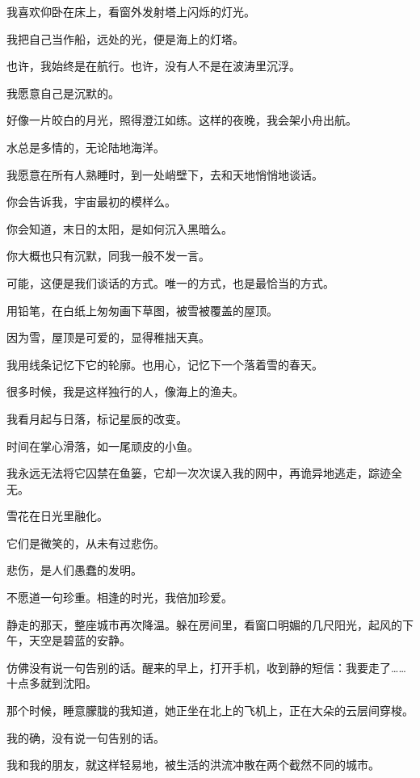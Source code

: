 		\vspace{1em}
		我喜欢仰卧在床上，看窗外发射塔上闪烁的灯光。\par
		我把自己当作船，远处的光，便是海上的灯塔。\par
		也许，我始终是在航行。也许，没有人不是在波涛里沉浮。\par
		我愿意自己是沉默的。\par
		好像一片皎白的月光，照得澄江如练。这样的夜晚，我会架小舟出航。\par
		水总是多情的，无论陆地海洋。\par
		我愿意在所有人熟睡时，到一处峭壁下，去和天地悄悄地谈话。\par
		你会告诉我，宇宙最初的模样么。\par
		你会知道，末日的太阳，是如何沉入黑暗么。\par
		你大概也只有沉默，同我一般不发一言。\par
		可能，这便是我们谈话的方式。唯一的方式，也是最恰当的方式。

		\vspace{1em}
		用铅笔，在白纸上匆匆画下草图，被雪被覆盖的屋顶。\par
		因为雪，屋顶是可爱的，显得稚拙天真。\par
		我用线条记忆下它的轮廓。也用心，记忆下一个落着雪的春天。\par
		很多时候，我是这样独行的人，像海上的渔夫。\par
		我看月起与日落，标记星辰的改变。\par
		时间在掌心滑落，如一尾顽皮的小鱼。\par
		我永远无法将它囚禁在鱼篓，它却一次次误入我的网中，再诡异地逃走，踪迹全无。

		\vspace{1em}
		雪花在日光里融化。\par
		它们是微笑的，从未有过悲伤。\par
		悲伤，是人们愚蠢的发明。

	\endwriting



		不愿道一句珍重。相逢的时光，我倍加珍爱。


		\vspace{1em}
		静走的那天，整座城市再次降温。躲在房间里，看窗口明媚的几尺阳光，起风的下午，天空是碧蓝的安静。\par
		仿佛没有说一句告别的话。醒来的早上，打开手机，收到静的短信：我要走了…… 十点多就到沈阳。\par
		那个时候，睡意朦胧的我知道，她正坐在北上的飞机上，正在大朵的云层间穿梭。\par
		我的确，没有说一句告别的话。\par
		我和我的朋友，就这样轻易地，被生活的洪流冲散在两个截然不同的城市。

